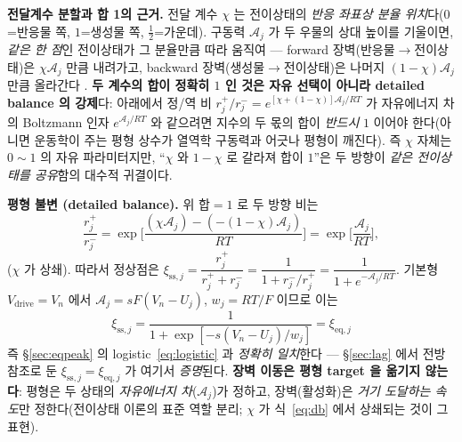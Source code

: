\documentclass[11pt,a4paper]{article}
\newcommand{\eq}{\mathrm{eq}}
\newcommand{\drive}{\mathrm{drive}}
\newcommand{\sstat}{\mathrm{ss}}
\begin{document}
\textbf{전달계수 분할과 합 1의 근거.} 전달 계수 $\chi$ 는 전이상태의 \emph{반응 좌표상 분율
위치}다($0$=반응물 쪽, $1$=생성물 쪽, $\tfrac12$=가운데). 구동력 $\mathcal A_j$ 가 두 우물의 상대 높이를
기울이면, \emph{같은 한 점}인 전이상태가 그 분율만큼 따라 움직여 — forward 장벽(반응물$\to$전이상태)은
$\chi\mathcal A_j$ 만큼 내려가고, backward 장벽(생성물$\to$전이상태)은 나머지 $(1-\chi)\mathcal A_j$ 만큼 올라간다
\cite{evanspolanyi1938,bardfaulkner}. \textbf{두 계수의 합이 정확히 $1$ 인 것은 자유 선택이 아니라 detailed
balance 의 강제}다: 아래에서 정/역 비 $r_j^+/r_j^-=e^{[\chi+(1-\chi)]\mathcal A_j/RT}$ 가 자유에너지 차의
Boltzmann 인자 $e^{\mathcal A_j/RT}$ 와 같으려면 지수의 두 몫의 합이 \emph{반드시} $1$ 이어야 한다(아니면
운동학이 주는 평형 상수가 열역학 구동력과 어긋나 평형이 깨진다). 즉 $\chi$ 자체는 $0\!\sim\!1$ 의 자유
파라미터지만, ``$\chi$ 와 $1-\chi$ 로 갈라져 합이 $1$''은 두 방향이 \emph{같은 전이상태를 공유}함의 대수적
귀결이다.

\textbf{평형 불변 (detailed balance).} 위 합$=1$ 로 두 방향 비는
\begin{equation}
\frac{r_j^+}{r_j^-}=\exp\!\Big[\frac{(\chi\mathcal A_j)-(-(1-\chi)\mathcal A_j)}{RT}\Big]
=\exp\!\Big[\frac{\mathcal A_j}{RT}\Big],
\label{eq:db}
\end{equation}
($\chi$ 가 상쇄). 따라서 정상점은 $\xi_{\sstat,j}=\dfrac{r_j^+}{r_j^++r_j^-}=\dfrac{1}{1+r_j^-/r_j^+}
=\dfrac{1}{1+e^{-\mathcal A_j/RT}}$. 기본형 $V_\drive=V_n$ 에서 $\mathcal A_j=sF(V_n-U_j)$, $w_j=RT/F$ 이므로 이는
\begin{equation}
\xi_{\sstat,j}=\frac{1}{1+\exp[-s(V_n-U_j)/w_j]}=\xi_{\eq,j}
\label{eq:sseq}
\end{equation}
즉 \S\ref{sec:eqpeak} 의 logistic~\eqref{eq:logistic} 과 \emph{정확히 일치}한다 — \S\ref{sec:lag} 에서 전방참조로
둔 $\xi_{\sstat,j}=\xi_{\eq,j}$ 가 여기서 \emph{증명}된다. \textbf{장벽 이동은 평형 target 을 옮기지 않는다}: 평형은 두
상태의 \emph{자유에너지 차}($\mathcal A_j$)가 정하고, 장벽(활성화)은 \emph{거기 도달하는 속도}만 정한다(전이상태
이론의 표준 역할 분리; $\chi$ 가 식~\eqref{eq:db} 에서 상쇄되는 것이 그 표현).
\end{document}
